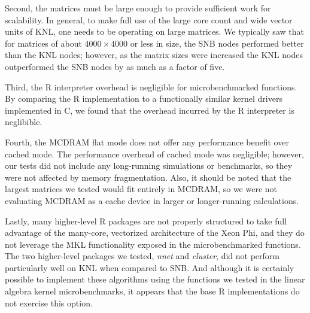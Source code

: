 Second, the matrices must be large enough to provide sufficient work for
  scalability.
In general, to make full use of the large core count and wide vector units
  of KNL, one needs to be operating on large matrices.
We typically saw that for matrices of about $4000\times 4000$ or less in
  size, the SNB nodes performed better than the KNL nodes;
  however, as the matrix sizes were increased the KNL nodes outperformed
  the SNB nodes by as much as a factor of five.

Third, the R interpreter overhead is negligible for microbenchmarked functions.
By comparing the R implementation to a functionally similar kernel drivers
  implemented in C, we found that the overhead incurred by the R interpreter is
  neglibible.

Fourth, the MCDRAM flat mode does not offer any performance
  benefit over cached mode.
The performance overhead of cached mode was negligible; however, our tests
  did not include any long-running simulations or benchmarks, so they were
  not affected by memory fragmentation.
  Also, it should be noted that the largest matrices we tested would fit
  entirely in MCDRAM, so we were not evaluating MCDRAM as a cache device
  in larger or longer-running calculations.

Lastly, many higher-level R packages are not properly structured to take
  full advantage of the many-core, vectorized architecture of the Xeon Phi,
  and they do not leverage the MKL functionality exposed in the microbenchmarked
  functions.
The two higher-level packages we tested, \textit{nnet} and \textit{cluster},
  did not perform particularly well on KNL when compared to SNB.
And although it is certainly possible to implement these algorithms using the
  functions we tested in the linear algebra kernel microbenchmarks, it appears
  that the base R implementations do not exercise this option.

